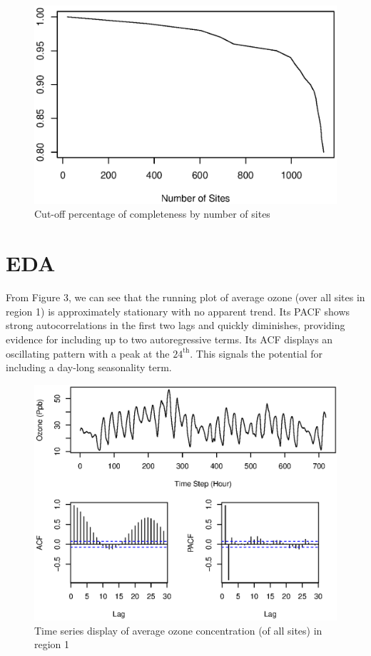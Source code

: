 \documentclass[12pt]{article}
\begin{document}
\begin{figure}[H]
\centering
\includegraphics[scale = 0.4]{completeness_by_n_sites.eps}
\caption{Cut-off percentage of completeness by number of sites}
\end{figure}

\section{EDA}
From Figure 3, we can see that the running plot of average ozone (over all sites in region 1) is approximately stationary with no apparent trend. Its PACF shows strong autocorrelations in the first two lags and quickly diminishes, providing evidence for including up to two autoregressive terms. Its ACF displays an oscillating pattern with a peak at the $24^{\text{th}}$. This signals the potential for including a day-long seasonality term. 

\begin{figure}[H]
\centering
\includegraphics[scale = 0.4]{ts_o3.eps}
\caption{Time series display of average ozone concentration (of all sites) in region 1}
\end{figure}
\end{document}
